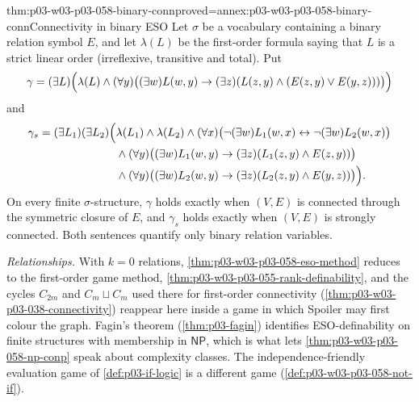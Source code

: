 \begin{hblemma}{thm:p03-w03-p03-058-binary-conn}{proved=annex:p03-w03-p03-058-binary-conn}{Connectivity in binary ESO}
Let \(\sigma\) be a vocabulary containing a binary relation symbol \(E\),
and let \(\lambda(L)\) be the first-order formula saying that \(L\) is a
strict linear order (irreflexive, transitive and total). Put
\[
 \gamma=(\exists L)\Bigl(\lambda(L)\wedge(\forall y)\bigl((\exists w)L(w,y)
 \to(\exists z)(L(z,y)\wedge(E(z,y)\vee E(y,z)))\bigr)\Bigr)
\]
and
\[
 \begin{aligned}
 \gamma_s=(\exists L_1)(\exists L_2)\Bigl(&\lambda(L_1)\wedge\lambda(L_2)
 \wedge(\forall x)\bigl(\neg(\exists w)L_1(w,x)\leftrightarrow
 \neg(\exists w)L_2(w,x)\bigr)\\
 &\wedge(\forall y)\bigl((\exists w)L_1(w,y)\to(\exists z)(L_1(z,y)\wedge
 E(z,y))\bigr)\\
 &\wedge(\forall y)\bigl((\exists w)L_2(w,y)\to(\exists z)(L_2(z,y)\wedge
 E(y,z))\bigr)\Bigr).
 \end{aligned}
\]
On every finite \(\sigma\)-structure, \(\gamma\) holds exactly when
\((V,E)\) is connected through the symmetric closure of \(E\), and
\(\gamma_s\) holds exactly when \((V,E)\) is strongly connected. Both
sentences quantify only binary relation variables.
\end{hblemma}

\emph{Relationships.} With \(k=0\) relations,
\cref{thm:p03-w03-p03-058-eso-method} reduces to the first-order game
method, \cref{thm:p03-w03-p03-055-rank-definability}, and the cycles
\(C_{2m}\) and \(C_m\sqcup C_m\) used there for first-order connectivity
(\cref{thm:p03-w03-p03-038-connectivity}) reappear here inside a game in which
Spoiler may first colour the graph. Fagin's theorem (\cref{thm:p03-fagin})
identifies ESO-definability on finite structures with membership in
\(\mathsf{NP}\), which is what lets \cref{thm:p03-w03-p03-058-np-conp}
speak about complexity classes. The independence-friendly evaluation game
of \cref{def:p03-if-logic} is a different game
(\cref{def:p03-w03-p03-058-not-if}).

